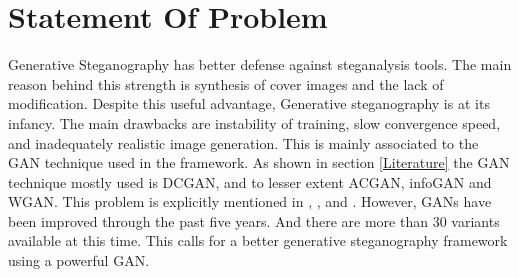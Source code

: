 \documentclass[../main/main.tex]{subfiles}
\begin{document}
	
	\section{Statement Of Problem} \label{statement}
	Generative Steganography has better defense against steganalysis tools. The main reason behind this strength is  synthesis of cover images and the lack of modification. Despite this useful advantage, Generative steganography is at its infancy. The main drawbacks are instability of training, slow convergence speed, and inadequately realistic image generation. This is mainly associated to the \gls{GAN} technique used in the framework. As shown in section \ref{Literature} the \gls{GAN} technique mostly used is \gls{DCGAN}, and to lesser extent \gls{ACGAN}, \gls{infoGAN} and \gls{WGAN}. This problem is explicitly mentioned in , , and .
	However, \gls{GAN}s have been improved through the past five years. And there are more than 30 variants available at this time. This calls for a better generative steganography framework using a powerful \gls{GAN}.
\end{document}

